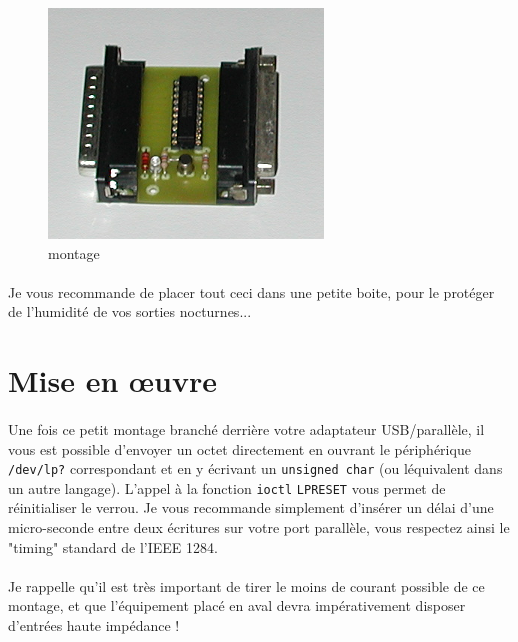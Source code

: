 \documentclass[11pt,a4paper]{book}
\begin{document}
 \begin{figure}
 \center
 \includegraphics[scale=1.1]{./medias/latch4.png}
 \caption{montage}
 \label{latch4}
 \end{figure}
 
 \paragraph*{}
 Je vous recommande de placer tout ceci dans une petite boite, pour le prot\'eger de l'humidit\'e
 de vos sorties nocturnes...

\section{Mise en \oe uvre}

\paragraph*{}
Une fois ce petit montage branch\'e derri\`ere votre adaptateur USB/parall\`ele, il vous est
possible d'envoyer un octet directement en ouvrant le p\'eriph\'erique {\tt /dev/lp?} 
correspondant et en y \'ecrivant un {\tt unsigned char} (ou l\'equivalent dans un autre langage).
L'appel \`a la fonction {\tt ioctl} {\tt LPRESET} vous permet de r\'einitialiser le verrou. Je vous
recommande simplement d'ins\'erer un d\'elai d'une micro-seconde entre deux \'ecritures sur votre
port parall\`ele, vous respectez ainsi le "timing" standard de l'IEEE 1284.

\paragraph*{}
Je rappelle qu'il est tr\`es important de tirer le moins de courant possible de ce montage, et que
 l'\'equipement plac\'e en aval devra imp\'erativement disposer d'entr\'ees haute imp\'edance !

\listoffigures
\end{document}
